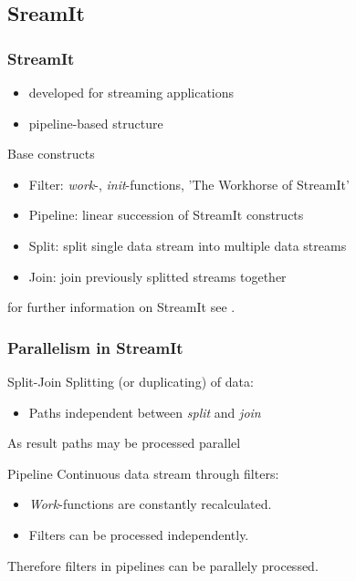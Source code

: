\documentclass{beamer}
\begin{document}
\subsection{SreamIt}
\begin{frame}
\frametitle{StreamIt}
	\begin{itemize}
		\item developed for streaming applications
		\item pipeline-based structure
	\end{itemize}
	\begin{block}{Base constructs}
		\begin{itemize}
			\item Filter: \textit{work}-, \textit{init}-functions, 'The Workhorse of StreamIt'
			\item Pipeline: linear succession of StreamIt constructs
			\item Split: split single data stream into multiple data streams
			\item Join: join previously splitted streams together
		\end{itemize}
	\end{block}
	for further information on StreamIt see \cite{streamIt}.
\end{frame}

\begin{frame}
\frametitle{Parallelism in StreamIt}
	\begin{block}{Split-Join}
		Splitting (or duplicating) of data:\\
		\begin{itemize}
			\item Paths independent between \textit{split} and \textit{join}
		\end{itemize}
		As result paths may be processed parallel
	\end{block}
	\begin{block}{Pipeline}
		Continuous data stream through filters:\\
		\begin{itemize}
			\item \textit{Work}-functions are constantly recalculated.
			\item Filters can be processed independently.
		\end{itemize}
		Therefore filters in pipelines can be parallely processed.
	\end{block}
\end{frame}
\end{document}

